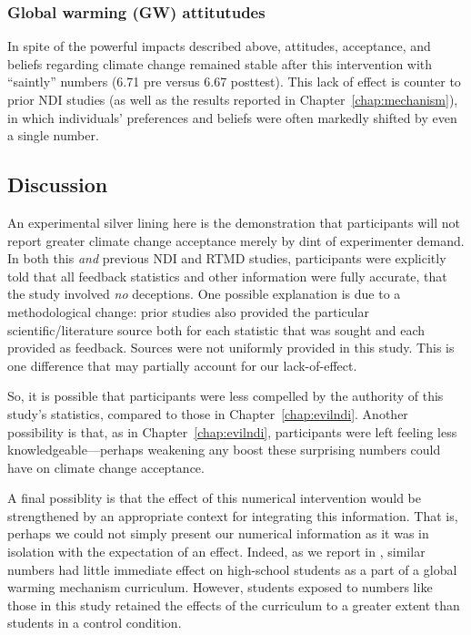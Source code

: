 \subsubsection{Global warming (GW) attitutudes}

In spite of the powerful impacts described above, attitudes, acceptance, and
beliefs regarding climate change remained stable after this intervention with
“saintly” numbers (6.71 pre versus 6.67 posttest).  This lack of effect is
counter to prior NDI studies (as well as the results reported in
Chapter~\ref{chap:mechanism}), in which individuals’ preferences and beliefs
were often markedly shifted by even a single number. 

\subsection{Discussion}


An experimental silver lining here is the demonstration that participants will
not report greater climate change acceptance merely by dint of experimenter
demand.  In both this \emph{and} previous NDI and RTMD studies, participants
were explicitly told that all feedback statistics and other information were
fully accurate, that the study involved \emph{no} deceptions.  One possible
explanation is due to a methodological change: prior studies 
also provided the particular scientific/literature source both
for each statistic that was sought and each provided as feedback.
Sources were not uniformly provided in this study. This is one
difference that may partially account for our lack-of-effect.

So, it is possible that participants were less compelled by the authority of
this study’s statistics, compared to those in Chapter~\ref{chap:evilndi}.
Another possibility is that, as in Chapter~\ref{chap:evilndi}, participants were
left feeling less knowledgeable---perhaps weakening any boost these surprising numbers
could have on climate change acceptance.  

A final possiblity is that the effect of this numerical intervention would be
strengthened by an appropriate context for integrating this information. That
is, perhaps we could not simply present our numerical information as it was in
isolation with the expectation of an effect. Indeed, as we report in
\parencite{clark_knowledge_inpress}, similar numbers had little immediate effect on
high-school students as a part of a global warming mechanism curriculum.
However, students exposed to numbers like those in this study retained the
effects of the curriculum to a greater extent than students in a control
condition.

